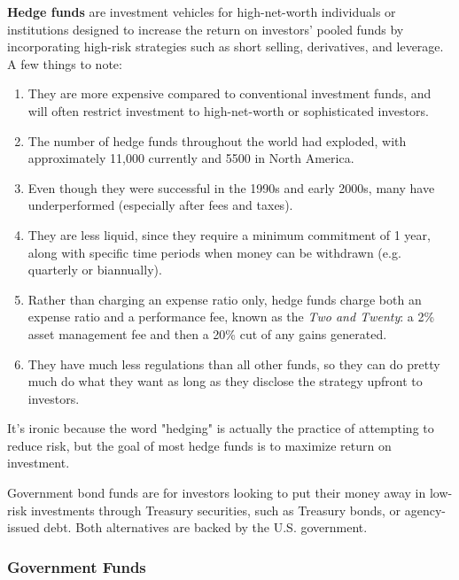 \documentclass{article}
\begin{document}
      \begin{definition}
        \label{def:hedge-funds}
        \textbf{Hedge funds} are investment vehicles for high-net-worth individuals or institutions designed to increase the return on investors' pooled funds by incorporating high-risk strategies such as short selling, derivatives, and leverage. A few things to note: 
        \begin{enumerate}
          \item They are more expensive compared to conventional investment funds, and will often restrict investment to high-net-worth or sophisticated investors. 
          \item The number of hedge funds throughout the world had exploded, with approximately 11,000 currently and 5500 in North America. 
          \item Even though they were successful in the 1990s and early 2000s, many have underperformed (especially after fees and taxes). 
          \item They are less liquid, since they require a minimum commitment of 1 year, along with specific time periods when money can be withdrawn (e.g. quarterly or biannually). 
          \item Rather than charging an expense ratio only, hedge funds charge both an expense ratio and a performance fee, known as the \textit{Two and Twenty}: a 2\% asset management fee and then a 20\% cut of any gains generated. 
          \item They have much less regulations than all other funds, so they can do pretty much do what they want as long as they disclose the strategy upfront to investors. 
        \end{enumerate}
        It's ironic because the word "hedging" is actually the practice of attempting to reduce risk, but the goal of most hedge funds is to maximize return on investment. 
      \end{definition}

      \begin{definition}
        \label{def:government-bond-funds}
        Government bond funds are for investors looking to put their money away in low-risk investments through Treasury securities, such as Treasury bonds, or agency-issued debt. Both alternatives are backed by the U.S. government. 
      \end{definition}

    \subsubsection{Government Funds}
\end{document}
